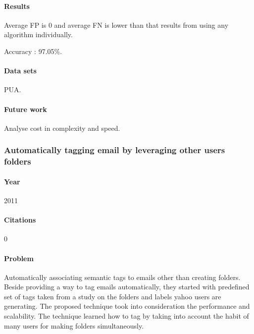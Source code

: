 \documentclass[12pt]{article}
\newenvironment{my_itemize}
{\begin{itemize}
  \setlength{\itemsep}{0cm}
  \setlength{\parskip}{0cm}}
{\end{itemize}}
\begin{document}
\paragraph{Results}
\begin{my_itemize}
  \item Average FP is 0 and average FN is lower than that results from using any algorithm individually.
  \item Accuracy : 97.05\%.
\end{my_itemize}

\paragraph{Data sets}
\begin{my_itemize}
  \item PUA.
\end{my_itemize}

\paragraph{Future work}
\begin{my_itemize}
  \item Analyse cost in complexity and speed.
\end{my_itemize}


\subsubsection{Automatically tagging email by leveraging other users folders \cite{YEHUDA11}}

\paragraph{Year} 2011
\paragraph{Citations} 0

\paragraph{Problem}
\begin{my_itemize}
  \item Automatically associating semantic tags to emails other than creating folders. 
	Beside providing a way to tag emails automatically, they started with predefined 
	set of tags taken from a study on the folders and labels yahoo users are generating. 
	The proposed technique took into consideration the performance and scalability. 
	The technique learned how to tag by taking into account the habit of many users for 
	making folders simultaneously.
\end{my_itemize}
\end{document}
